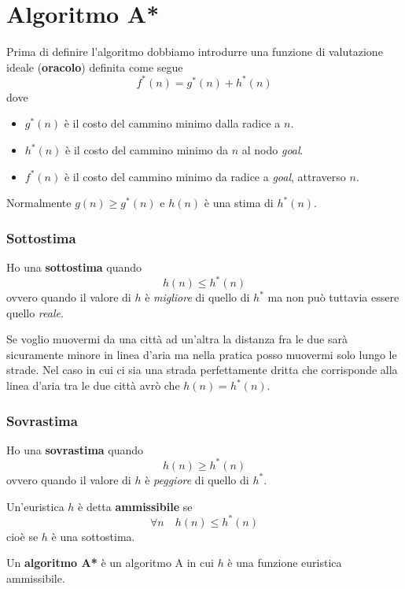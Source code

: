 \section{Algoritmo A*}
Prima di definire l'algoritmo dobbiamo introdurre una funzione di valutazione ideale
(\textbf{oracolo}) definita come segue
\[ f^*(n) = g^*(n) + h^*(n) \]
dove
\begin{itemize}
	\item $g^*(n)$ \`e il costo del cammino minimo dalla radice a $n$.
	\item $h^*(n)$ \`e il costo del cammino minimo da $n$ al nodo \emph{goal}.
	\item $f^*(n)$ \`e il costo del cammino minimo da radice a \emph{goal}, attraverso $n$.
\end{itemize}
Normalmente $g(n) \geq g^*(n)$ e $h(n)$ \`e una stima di $h^*(n)$.

\subsubsection{Sottostima}
Ho una \textbf{sottostima} quando \[ h(n) \leq h^*(n) \] ovvero quando il valore di $h$ \`e
\emph{migliore} di quello di $h^*$ ma non pu\`o tuttavia essere quello \emph{reale}.

\begin{example}
	Se voglio muovermi da una citt\`a ad un'altra la distanza fra le due sar\`a sicuramente
	minore in linea d'aria ma nella pratica posso muovermi solo lungo le strade. Nel caso
	in cui ci sia una strada perfettamente dritta che corrisponde alla linea d'aria tra le
	due citt\`a avr\`o che $h(n) = h^*(n)$.
\end{example}

\subsubsection{Sovrastima}
Ho una \textbf{sovrastima} quando \[ h(n) \geq h^*(n) \] ovvero quando il valore di $h$ \`e
\emph{peggiore} di quello di $h^*$.

\begin{definition}
	Un'euristica $h$ \`e detta \textbf{ammissibile} se
	\[ \forall n \quad h(n) \leq h^*(n) \]
	cio\`e se $h$ \`e una sottostima.
\end{definition}

\begin{definition}
	Un \textbf{algoritmo A*} \`e un algoritmo A in cui $h$ \`e una funzione euristica
	ammissibile.
\end{definition}


